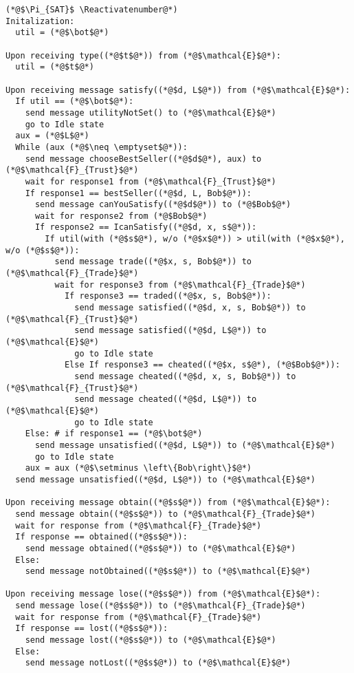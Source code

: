 \Suppressnumber
\begin{lstlisting}[label=satprot, style=numbers]
(*@$\Pi_{SAT}$ \Reactivatenumber@*)
Initalization:
  util = (*@$\bot$@*)

Upon receiving type((*@$t$@*)) from (*@$\mathcal{E}$@*):
  util = (*@$t$@*)

Upon receiving message satisfy((*@$d, L$@*)) from (*@$\mathcal{E}$@*):
  If util == (*@$\bot$@*):
    send message utilityNotSet() to (*@$\mathcal{E}$@*)
    go to Idle state
  aux = (*@$L$@*)
  While (aux (*@$\neq \emptyset$@*)):
    send message chooseBestSeller((*@$d$@*), aux) to (*@$\mathcal{F}_{Trust}$@*)
    wait for response1 from (*@$\mathcal{F}_{Trust}$@*)
    If response1 == bestSeller((*@$d, L, Bob$@*)):
      send message canYouSatisfy((*@$d$@*)) to (*@$Bob$@*)
      wait for response2 from (*@$Bob$@*)
      If response2 == IcanSatisfy((*@$d, x, s$@*)):
        If util(with (*@$s$@*), w/o (*@$x$@*)) > util(with (*@$x$@*), w/o (*@$s$@*)):
          send message trade((*@$x, s, Bob$@*)) to (*@$\mathcal{F}_{Trade}$@*)
          wait for response3 from (*@$\mathcal{F}_{Trade}$@*)
            If response3 == traded((*@$x, s, Bob$@*)):
              send message satisfied((*@$d, x, s, Bob$@*)) to (*@$\mathcal{F}_{Trust}$@*)
              send message satisfied((*@$d, L$@*)) to (*@$\mathcal{E}$@*)
              go to Idle state
            Else If response3 == cheated((*@$x, s$@*), (*@$Bob$@*)):
              send message cheated((*@$d, x, s, Bob$@*)) to (*@$\mathcal{F}_{Trust}$@*)
              send message cheated((*@$d, L$@*)) to (*@$\mathcal{E}$@*)
              go to Idle state
    Else: # if response1 == (*@$\bot$@*)
      send message unsatisfied((*@$d, L$@*)) to (*@$\mathcal{E}$@*)
      go to Idle state
    aux = aux (*@$\setminus \left\{Bob\right\}$@*)
  send message unsatisfied((*@$d, L$@*)) to (*@$\mathcal{E}$@*)

Upon receiving message obtain((*@$s$@*)) from (*@$\mathcal{E}$@*):
  send message obtain((*@$s$@*)) to (*@$\mathcal{F}_{Trade}$@*)
  wait for response from (*@$\mathcal{F}_{Trade}$@*)
  If response == obtained((*@$s$@*)):
    send message obtained((*@$s$@*)) to (*@$\mathcal{E}$@*)
  Else:
    send message notObtained((*@$s$@*)) to (*@$\mathcal{E}$@*)

Upon receiving message lose((*@$s$@*)) from (*@$\mathcal{E}$@*):
  send message lose((*@$s$@*)) to (*@$\mathcal{F}_{Trade}$@*)
  wait for response from (*@$\mathcal{F}_{Trade}$@*)
  If response == lost((*@$s$@*)):
    send message lost((*@$s$@*)) to (*@$\mathcal{E}$@*)
  Else:
    send message notLost((*@$s$@*)) to (*@$\mathcal{E}$@*)


\end{lstlisting}
